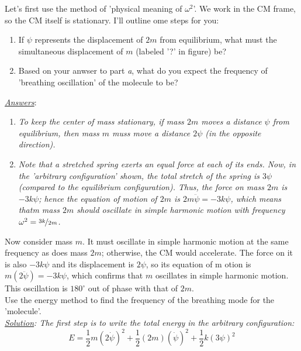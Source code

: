 \documentclass{report}
\begin{document}
{\noindent Let's first use the method of 'physical meaning of $\omega^2$'. We work in the CM frame, so the CM itself is stationary. I'll outline ome steps for you:
\begin{enumerate}[label=\alph*.]
  \item If $\psi$ represents the displacement of $2m$ from equilibrium, what must the simultaneous displacement of $m$ (labeled '?' in figure) be?
  \item Based on your anwser to part \textit{a}, what do you expect the frequency of 'breathing oscillation' of the molecule to be?
\end{enumerate}
\underline{\textit{Answers}}:
\begin{enumerate}[label=\alph*.]
  \item \textit{To keep the center of mass stationary, if mass $2m$ moves a distance $\psi$ from equilibrium, then mass $m$ muss move a distance $2\psi$ (in the opposite direction).}
  \item \textit{Note that a stretched spring exerts an equal force at each of its ends. Now, in the 'arbitrary configuration' shown, the total stretch of the spring is $3\psi$ (compared to the equilibrium configuration). Thus, the force on mass $2m$ is $-3k\psi$; hence the equation of motion of $2m$ is $2m\ddot{\psi}=-3k\psi$, which means thatm mass $2m$ should oscillate in simple harmonic motion with frequency $\omega^2=\nicefrac{3k}{2m}$.}
\end{enumerate}
\noindent Now consider mass $m$. It must oscillate in simple harmonic motion at the same frequency as does mass $2m$; otherwise, the CM would accelerate. The force on it is also $-3k\psi$ and its displacement is $2\psi$, so its equation of m otion is $m(2\ddot{\psi})=-3k\psi$, which confirms that $m$ oscillates in simple harmonic motion. This oscillation is $180^\circ$ out of phase with that of $2m$.\\

\noindent Use the energy method to find the frequency of the breathing mode for the 'molecule'.\\
\noindent \textit{\underline{Solution}: The first step is to write the total energy in the arbitrary configuration:
\[E=\dfrac12 m(2\dot{\psi})^2+\dfrac12(2m)(\dot{\psi})^2+\dfrac12 k(3\psi)^2\]} }
\end{document}
